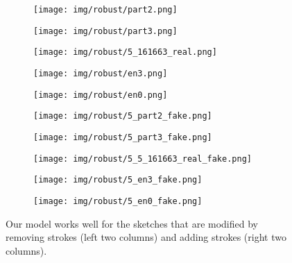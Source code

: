\documentclass[10pt,twocolumn,letterpaper]{article}
\begin{document}
\newcommand{\robustwidth}{0.18} 
\begin{figure}[tbp]
\captionsetup[subfigure]{labelformat=empty}
\begin{center}
\begin{subfigure}[b]{\robustwidth\linewidth}
  \texttt{[image: img/robust/part2.png]}
  \end{subfigure}
  \begin{subfigure}[b]{\robustwidth\linewidth}
  \texttt{[image: img/robust/part3.png]}
  \end{subfigure}  
  \begin{subfigure}[b]{\robustwidth\linewidth}
  \texttt{[image: img/robust/5\_161663\_real.png]}
  \end{subfigure}
  \begin{subfigure}[b]{\robustwidth\linewidth}
  \texttt{[image: img/robust/en3.png]}
  \end{subfigure}
\begin{subfigure}[b]{\robustwidth\linewidth}
  \texttt{[image: img/robust/en0.png]}
  \end{subfigure}


  
\begin{subfigure}[b]{\robustwidth\linewidth}
  \texttt{[image: img/robust/5\_part2\_fake.png]}
  \subcaption{$--$}
  \end{subfigure}
 \begin{subfigure}[b]{\robustwidth\linewidth}
  \texttt{[image: img/robust/5\_part3\_fake.png]}
  \subcaption{$-$}
  \end{subfigure}  
\begin{subfigure}[b]{\robustwidth\linewidth}
  \texttt{[image: img/robust/5\_5\_161663\_real\_fake.png]}
  \end{subfigure}
  \begin{subfigure}[b]{\robustwidth\linewidth}
  \texttt{[image: img/robust/5\_en3\_fake.png]}
  \subcaption{$+$}
  \end{subfigure}
\begin{subfigure}[b]{\robustwidth\linewidth}
  \texttt{[image: img/robust/5\_en0\_fake.png]}
  \subcaption{$++$}
  \end{subfigure}
\end{center}
\caption{Our model works well for the sketches that are modified by removing strokes (left two columns) and adding strokes (right two columns).}
 \label{fig:robust}
\end{figure}
\end{document}
